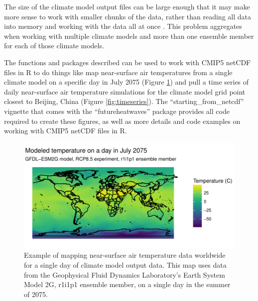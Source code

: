 The size of the climate model output files can be large enough that it
may make more sense to work with smaller chunks of the data, rather than
reading all data into memory and working with the data all at once
\citep{RCMIP5}. This problem aggregates when working with multiple
climate models and more than one ensemble member for each of those
climate models.

The functions and packages described can be used to work with CMIP5
netCDF files in R to do things like map near-surface air temperatures
from a single climate model on a specific day in July 2075 (Figure
\ref{fig:worldmap}) and pull a time series of daily near-surface air
temperature simulations for the climate model grid point closest to
Beijing, China (Figure \ref{fig:timeseries}). The
``starting\_from\_netcdf'' vignette that comes with the
``futureheatwaves'' package provides all code required to create these
figures, as well as more details and code examples on working with CMIP5
netCDF files in R.

\begin{figure}
\begin{center}
\includegraphics[width = \textwidth]{worldmapexample}
\end{center}
\caption{Example of mapping near-surface air temperature data worldwide for a single day of climate model output data. This map uses data from the Geophysical Fluid Dynamics Laboratory's Earth System Model 2G, r1i1p1 ensemble member, on a single day in the summer of 2075.}
\label{fig:worldmap}
\end{figure}


